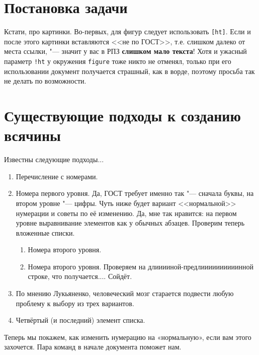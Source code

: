 \section{Постановка задачи}


Кстати, про картинки. Во-первых, для фигур следует использовать \texttt{[ht]}. Если и после этого картинки вставляются <<не по ГОСТ>>, т.е. слишком далеко от места ссылки, "--- значит у вас в РПЗ \textbf{слишком мало текста}! Хотя и ужасный параметр \texttt{!ht} у окружения \texttt{figure} тоже никто не отменял, только при его использовании документ получается страшный, как в ворде, поэтому просьба так не делать по возможности.

\section{Существующие подходы к созданию всячины}

Известны следующие подходы...

\begin{enumerate}
    \item Перечисление с номерами.
    \item Номера первого уровня. Да, ГОСТ требует именно так "--- сначала буквы, на втором уровне "--- цифры.
    Чуть ниже будет вариант <<нормальной>> нумерации и советы по её изменению.
    Да, мне так нравится: на первом уровне выравнивание элементов как у обычных абзацев. Проверим теперь вложенные списки.
    \begin{enumerate}
        \item Номера второго уровня.
        \item Номера второго уровня. Проверяем на длииииной-предлиииииииииинной строке, что получается.... Сойдёт.
    \end{enumerate}
    \item По мнению Лукьяненко, человеческий мозг старается подвести любую проблему к выбору
    из трех вариантов.
    \item Четвёртый (и последний) элемент списка.
\end{enumerate}

Теперь мы покажем, как изменить нумерацию на «нормальную», если вам этого захочется. Пара команд в начале документа поможет нам.

\renewcommand{\labelenumi}{\arabic{enumi})}
\renewcommand{\labelenumii}{\asbuk{enumii})}

